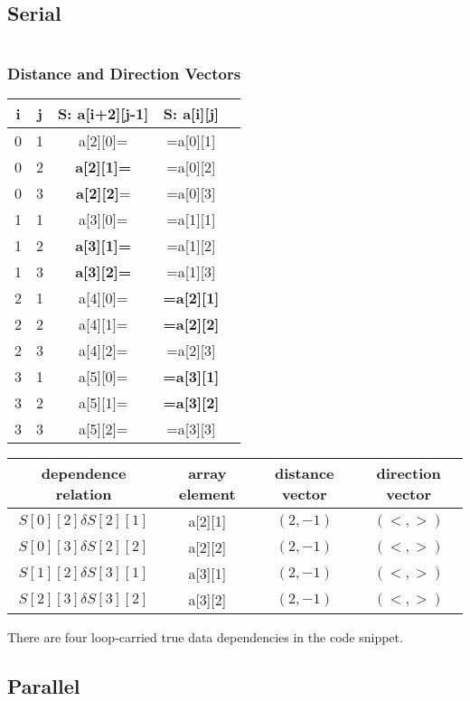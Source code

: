 \documentclass[parskip]{scrartcl}
\begin{document}
	\subsection{Serial}
	\inputminted	[linenos]{c}{ex3/serial.c}
	\subsubsection{Distance and Direction Vectors}
	\begin{tabular}{|c|c|c|c|c|}
		\hline i & j & S: a[i+2][j-1] & S: a[i][j]\\
		\hline 0 & 1 & a[2][0]= & =a[0][1]\\
		\hline 0 & 2 & \textbf{a[2][1]=} & =a[0][2]\\
		\hline 0 & 3 & \textbf{a[2][2]}= & =a[0][3]\\
		\hline 1 & 1 & a[3][0]= & =a[1][1]\\
		\hline 1 & 2 & \textbf{a[3][1]=} & =a[1][2]\\
		\hline 1 & 3 & \textbf{a[3][2]=} & =a[1][3]\\
		\hline 2 & 1 & a[4][0]= & \textbf{=a[2][1]}\\
		\hline 2 & 2 & a[4][1]= & \textbf{=a[2][2]}\\
		\hline 2 & 3 & a[4][2]= & =a[2][3]\\		
		\hline 3 & 1 & a[5][0]= & \textbf{=a[3][1]}\\
		\hline 3 & 2 & a[5][1]= & \textbf{=a[3][2]}\\
		\hline 3 & 3 & a[5][2]= & =a[3][3]\\
		\hline
	\end{tabular}
	
	\begin{tabular}{|c|c|c|c|}
		\hline dependence relation & array element & distance vector & direction vector\\
		\hline $S[0][2]\delta S[2][1]$ & a[2][1] & $(2,-1)$ & $(<,>)$\\
		\hline $S[0][3]\delta S[2][2]$ & a[2][2] & $(2,-1)$ & $(<,>)$\\
		\hline $S[1][2]\delta S[3][1]$ & a[3][1] & $(2,-1)$ & $(<,>)$\\
		\hline $S[2][3]\delta S[3][2]$ & a[3][2] & $(2,-1)$ & $(<,>)$\\
		\hline
	\end{tabular}
	
	There are four loop-carried true data dependencies in the code snippet.
	\subsection{Parallel}
	\inputminted	[linenos]{c}{ex3/parallel.c}
\end{document}
